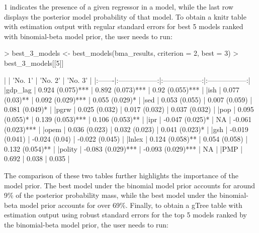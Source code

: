 \documentclass[a4paper]{article}
\begin{document}
1 indicates the presence of a given regressor in a model, while the last row displays the posterior model probability of that model.
To obtain a knitr table with estimation output with regular standard errors for best 5 models ranked with binomial-beta model prior, the user needs to run:
\begin{Schunk}
\begin{Sinput}
> best_3_models <- best_models(bma_results, criterion = 2, best = 3)
> best_3_models[[5]]
\end{Sinput}
\begin{Soutput}
|        |      'No. 1'      |      'No. 2'      |      'No. 3'      |
|:-------|:-----------------:|:-----------------:|:-----------------:|
|gdp_lag | 0.924 (0.075)***  | 0.892 (0.073)***  |  0.92 (0.055)***  |
|ish     |  0.077 (0.03)**   | 0.092 (0.029)***  |  0.055 (0.029)*   |
|sed     |   0.053 (0.055)   |   0.007 (0.059)   |  0.081 (0.049)*   |
|pgrw    |   0.025 (0.032)   |   0.017 (0.032)   |   0.037 (0.032)   |
|pop     |  0.095 (0.055)*   | 0.139 (0.053)***  |  0.106 (0.053)**  |
|ipr     |  -0.047 (0.025)*  |        NA         | -0.061 (0.023)*** |
|opem    |   0.036 (0.023)   |   0.032 (0.023)   |  0.041 (0.023)*   |
|gsh     |  -0.019 (0.041)   |   -0.024 (0.04)   |  -0.022 (0.045)   |
|lnlex   |  0.124 (0.058)**  |   0.054 (0.058)   |  0.132 (0.054)**  |
|polity  | -0.083 (0.029)*** | -0.093 (0.029)*** |        NA         |
|PMP     |       0.692       |       0.038       |       0.035       |
\end{Soutput}
\end{Schunk}
The comparison of these two tables further highlights the importance of the model prior.
The best model under the binomial model prior accounts for around 9\% of the posterior probability mass, while the best model under the binomial-beta model prior accounts for over 69\%.
Finally, to obtain a gTree table with estimation output using robust standard errors for the top 5 models ranked by the binomial-beta model prior, the user needs to run:
\end{document}
